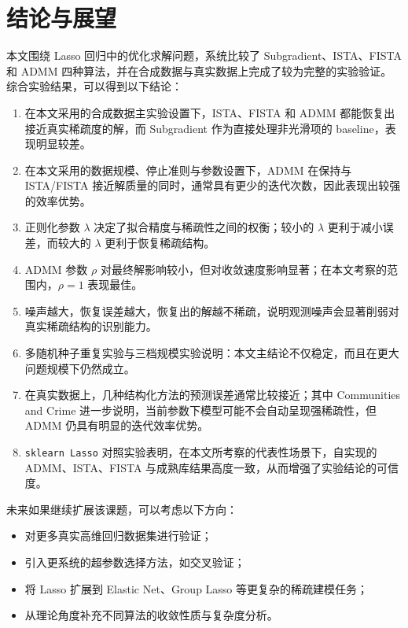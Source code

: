 \documentclass[12pt,a4paper]{ctexart}
\begin{document}
\section{结论与展望}
本文围绕 Lasso 回归中的优化求解问题，系统比较了 Subgradient、ISTA、FISTA 和 ADMM 四种算法，并在合成数据与真实数据上完成了较为完整的实验验证。综合实验结果，可以得到以下结论：
\begin{enumerate}[label=\arabic*.]
    \item 在本文采用的合成数据主实验设置下，ISTA、FISTA 和 ADMM 都能恢复出接近真实稀疏度的解，而 Subgradient 作为直接处理非光滑项的 baseline，表现明显较差。
    \item 在本文采用的数据规模、停止准则与参数设置下，ADMM 在保持与 ISTA/FISTA 接近解质量的同时，通常具有更少的迭代次数，因此表现出较强的效率优势。
    \item 正则化参数 $\lambda$ 决定了拟合精度与稀疏性之间的权衡；较小的 $\lambda$ 更利于减小误差，而较大的 $\lambda$ 更利于恢复稀疏结构。
    \item ADMM 参数 $\rho$ 对最终解影响较小，但对收敛速度影响显著；在本文考察的范围内，$\rho=1$ 表现最佳。
    \item 噪声越大，恢复误差越大，恢复出的解越不稀疏，说明观测噪声会显著削弱对真实稀疏结构的识别能力。
    \item 多随机种子重复实验与三档规模实验说明：本文主结论不仅稳定，而且在更大问题规模下仍然成立。
    \item 在真实数据上，几种结构化方法的预测误差通常比较接近；其中 Communities and Crime 进一步说明，当前参数下模型可能不会自动呈现强稀疏性，但 ADMM 仍具有明显的迭代效率优势。
    \item \texttt{sklearn Lasso} 对照实验表明，在本文所考察的代表性场景下，自实现的 ADMM、ISTA、FISTA 与成熟库结果高度一致，从而增强了实验结论的可信度。
\end{enumerate}

未来如果继续扩展该课题，可以考虑以下方向：
\begin{itemize}[leftmargin=2em]
    \item 对更多真实高维回归数据集进行验证；
    \item 引入更系统的超参数选择方法，如交叉验证；
    \item 将 Lasso 扩展到 Elastic Net、Group Lasso 等更复杂的稀疏建模任务；
    \item 从理论角度补充不同算法的收敛性质与复杂度分析。
\end{itemize}
\end{document}
